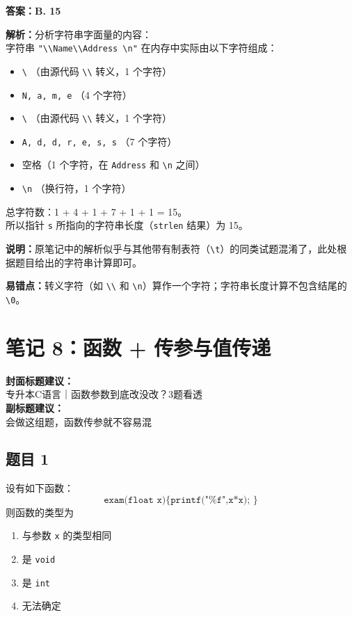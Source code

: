 \documentclass[12pt,a4paper]{ctexart}
\begin{document}
\begin{answerbox}
    \textbf{答案：B. 15}

    \textbf{解析：}分析字符串字面量的内容：\\
    字符串 \texttt{"\textbackslash\textbackslash Name\textbackslash\textbackslash Address \textbackslash n"} 在内存中实际由以下字符组成：\\
    \begin{itemize}
        \item \texttt{\textbackslash} （由源代码 \texttt{\textbackslash\textbackslash} 转义，1 个字符）
        \item \texttt{N, a, m, e} （4 个字符）
        \item \texttt{\textbackslash} （由源代码 \texttt{\textbackslash\textbackslash} 转义，1 个字符）
        \item \texttt{A, d, d, r, e, s, s} （7 个字符）
        \item 空格（1 个字符，在 \texttt{Address} 和 \texttt{\textbackslash n} 之间）
        \item \texttt{\textbackslash n} （换行符，1 个字符）
    \end{itemize}

    总字符数：1 + 4 + 1 + 7 + 1 + 1 = 15。\\
    所以指针 \texttt{s} 所指向的字符串长度（\texttt{strlen} 结果）为 15。

    \textbf{说明：}原笔记中的解析似乎与其他带有制表符（\texttt{\textbackslash t}）的同类试题混淆了，此处根据题目给出的字符串计算即可。

    \textbf{易错点：}转义字符（如 \texttt{\textbackslash\textbackslash} 和 \texttt{\textbackslash n}）算作一个字符；字符串长度计算不包含结尾的 \texttt{\textbackslash 0}。
\end{answerbox}

\newpage

\section{笔记 8：函数 + 传参与值传递}
\begin{coverbox}
	\textbf{封面标题建议：}\\
	专升本C语言｜函数参数到底改没改？3题看透\\
	\textbf{副标题建议：}\\
	会做这组题，函数传参就不容易混
\end{coverbox}

\subsection*{题目 1}
设有如下函数：
\[
	\texttt{exam(float x)\{ printf("\%f",x*x); \}}
\]
则函数的类型为
\begin{enumerate}[label=\Alph*.]
	\item 与参数 \texttt{x} 的类型相同
	\item 是 \texttt{void}
	\item 是 \texttt{int}
	\item 无法确定
\end{enumerate}
\end{document}
